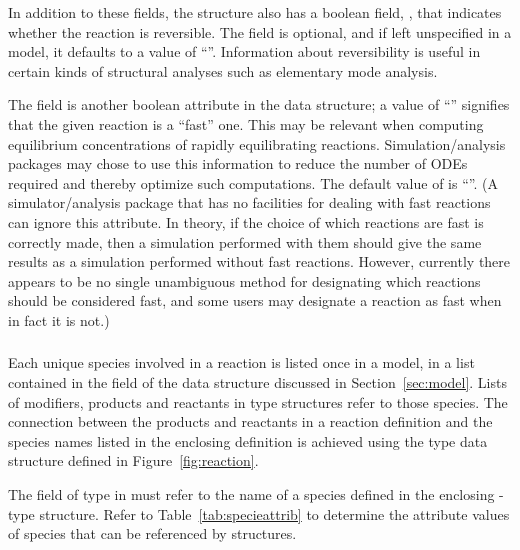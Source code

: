 \documentclass[10pt]{cekarticle}
\newcommand{\vref}[1]{\ref{#1}}
\begin{document}
In addition to these fields, the  structure also has a
boolean field, , that indicates whether the reaction is
reversible.  The field is optional, and if left unspecified in a model, it
defaults to a value of ``''.  Information about
reversibility is useful in certain kinds of structural analyses such as
elementary mode analysis.

The field  is another boolean attribute in the
 data structure; a value of ``''
signifies that the given reaction is a ``fast'' one.  This may be relevant
when computing equilibrium concentrations of rapidly equilibrating
reactions.  Simulation/analysis packages may chose to use this information
to reduce the number of ODEs required and thereby optimize such
computations.  The default value of  is
``''.  (A simulator/analysis package that has no
facilities for dealing with fast reactions can ignore this attribute. In
theory, if the choice of which reactions are fast is correctly made, then a
simulation performed with them should give the same results as a simulation
performed without fast reactions.  However, currently there appears to be
no single unambiguous method for designating which reactions should be
considered fast, and some users may designate a reaction as fast when in
fact it is not.)

\subsubsection{}
\label{subsec:speciesreference}

Each unique species involved in a reaction is listed once in a
model, in a list contained in the  field of the
 data structure discussed in Section~\ref{sec:model}.
Lists of modifiers, products and reactants in 
type structures refer to those species.  The connection between
the products and reactants in a reaction definition and the
species names listed in the enclosing  definition is
achieved using the  type data structure
defined in Figure~\vref{fig:reaction}.

The field  of type  in
 must refer to the name of a species
defined in the enclosing -type structure.  Refer to Table~\ref{tab:specieattrib} to determine the attribute values of species that can be referenced by  structures.
\end{document}
